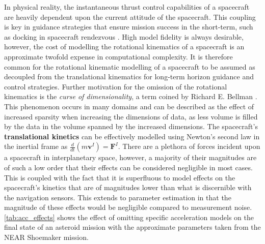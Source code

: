 In physical reality, the instantaneous thrust control capabilities of a spacecraft are heavily dependent upon the current attitude of the spacecraft. This coupling is key in guidance strategies that ensure mission success in the short-term, such as docking in spacecraft rendezvous \cite{Hovell2021}. High model fidelity is always desirable, however, the cost of modelling the rotational kinematics of a spacecraft is an approximate twofold expense in computational complexity. It is therefore common for the rotational kinematic modelling of a spacecraft to be assumed as decoupled from the translational kinematics for long-term horizon guidance and control strategies. Further motivation for the omission of the rotational kinematics is the \textit{curse of dimensionality}, a term coined by Richard E. Bellman \cite{bellman1957dynamic} \cite{bellman1961adaptive}. This phenomenon occurs in many domains and can be described as the effect of increased sparsity when increasing the dimensions of data, as less volume is filled by the data in the volume spanned by the increased dimensions. The spacecraft's \textbf{translational kinetics} can be effectively modelled using Newton's second law in the inertial frame as $\frac{d}{dt}(m\textbf{v}^I)=\textbf{F}^I$. There are a plethora of forces incident upon a spacecraft in interplanetary space, however, a majority of their magnitudes are of such a low order that their effects can be considered negligible in most cases. This is coupled with the fact that it is superfluous to model effects on the spacecraft's kinetics that are of magnitudes lower than what is discernible with the navigation sensors. This extends to parameter estimation in that the magnitude of these effects would be negligible compared to measurement noise. \autoref{tab:acc_effects} shows the effect of omitting specific acceleration models on the final state of an asteroid mission with the approximate parameters taken from the NEAR Shoemaker mission.

